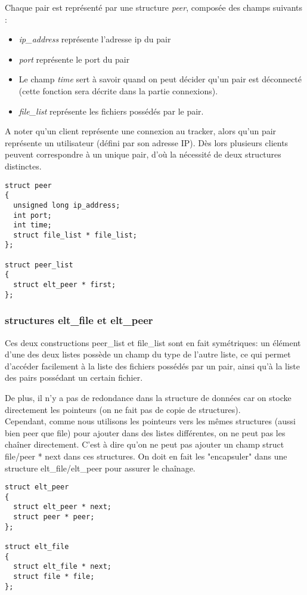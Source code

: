 Chaque pair est représenté par une structure \textit{peer}, composée des champs suivants :
\begin{itemize}
\item \textit{ip\_address} représente l'adresse ip du pair
\item \textit{port} représente le port du pair
\item Le champ \textit{time} sert à savoir quand on peut décider qu'un pair est déconnecté (cette fonction sera décrite dans la partie connexions).
\item \textit{file\_list} représente les fichiers possédés par le pair.
\end{itemize}
A noter qu'un client représente une connexion au tracker, alors qu'un pair représente un utilisateur (défini par son adresse IP). Dès lors plusieurs clients peuvent correspondre à un unique pair, d'où la nécessité de deux structures distinctes.
\begin{verbatim}
struct peer
{
  unsigned long ip_address;
  int port;
  int time;
  struct file_list * file_list;
};

struct peer_list
{
  struct elt_peer * first;
};
\end{verbatim}


\subsubsection{structures elt\_file et elt\_peer}

Ces deux constructions peer\_list et file\_list sont en fait symétriques: un élément d'une des deux listes possède un champ du type de l'autre liste, ce qui permet d'accéder facilement à la liste des fichiers possédés par un pair, ainsi qu'à la liste des pairs possédant un certain fichier.

De plus, il n'y a pas de redondance dans la structure de données car on stocke directement les pointeurs (on ne fait pas de copie de structures).\\ 
Cependant, comme nous utilisons les pointeurs vers les mêmes structures (aussi bien peer que file) pour ajouter dans des listes différentes, on ne peut pas les chaîner directement. C'est à dire qu'on ne peut pas ajouter un champ struct file/peer * next dans ces structures. On doit en fait les "encapsuler" dans une structure elt\_file/elt\_peer pour assurer le chaînage.
\begin{verbatim}
struct elt_peer
{
  struct elt_peer * next;
  struct peer * peer;
};

struct elt_file
{
  struct elt_file * next;
  struct file * file;
};
\end{verbatim}


